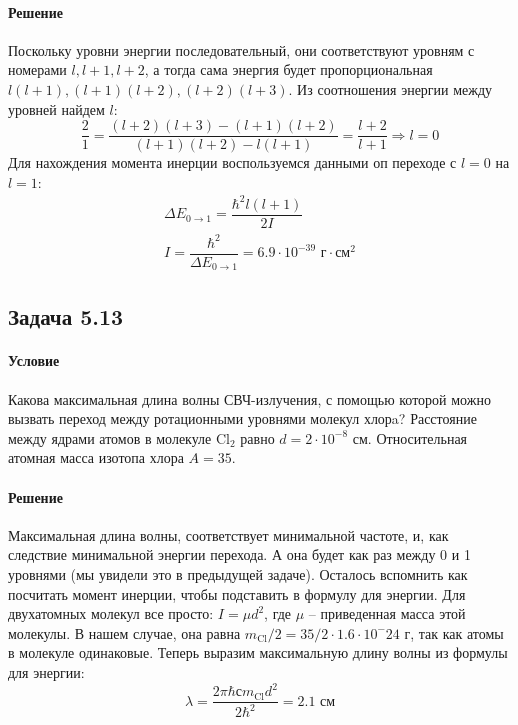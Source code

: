 \documentclass[12pt]{article}
\begin{document}
\paragraph{Решение}
Поскольку уровни энергии последовательный, они соответствуют уровням с номерами $l, l+1, l+2$, а тогда сама энергия будет пропорциональная $l(l+1), (l+1)(l+2), (l+2)(l+3)$. Из соотношения энергии между уровней найдем $l$:
\begin{equation*}
    \dfrac{2}{1} = \dfrac{(l+2)(l+3)-(l+1)(l+2)}{(l+1)(l+2)-l(l+1)} = \dfrac{l+2}{l+1} \Rightarrow l=0
\end{equation*}
Для нахождения момента инерции воспользуемся данными оп переходе с $l=0$ на $l=1$:
\begin{gather*}
    \Delta E_{0\rightarrow 1} = \dfrac{\hbar^2 l(l+1)}{2I}\\
    I = \dfrac{\hbar^2}{\Delta E_{0\rightarrow 1}} = 6.9\cdot 10^{-39} \text{ г}\cdot\text{см}^2
\end{gather*}

\subsection{Задача 5.13}
\label{task_5.13}
\paragraph{Условие} Какова максимальная длина волны СВЧ-излучения, с помощью которой можно вызвать переход между ротационными уровнями молекул хлорa? Расстояние между ядрами атомов в молекуле $\text{Cl}_2$ равно $d = 2 \cdot 10^{−8}$ см. Относительная атомная масса изотопа хлора $A=35$.
\paragraph{Решение}
Максимальная длина волны, соответствует минимальной частоте, и, как следствие минимальной энергии перехода. А она будет как раз между 0 и 1 уровнями (мы увидели это в предыдущей задаче). Осталось вспомнить как посчитать момент инерции, чтобы подставить в формулу для энергии. Для двухатомных молекул все просто: $I = \mu d^2$, где $\mu$ -- приведенная масса этой молекулы. В нашем случае, она равна $m_{\text{Cl}}/2 = 35/2 \cdot 1.6 \cdot 10^-24$ г, так как атомы в молекуле одинаковые. Теперь выразим максимальную длину волны из формулы для энергии:
\begin{equation*}
    \lambda = \dfrac{2\pi \hbar с m_{\text{Cl}} d^2}{2\hbar^2} = 2.1 \text{ см}
\end{equation*}
\end{document}
